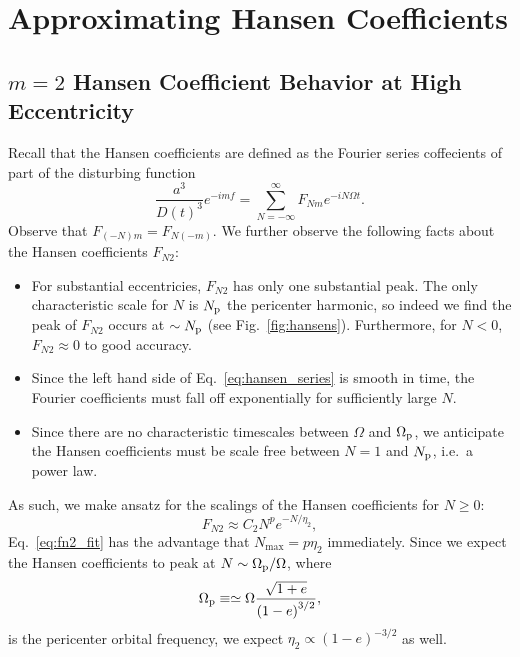 \documentclass[
        fleqn,
        usenatbib,
        referee,
    ]{mnras}
\newcommand*{\p}[1]{\left(#1\right)}
\begin{document}
\section{Approximating Hansen Coefficients}\label{s:hansens}

\subsection{$m=2$ Hansen Coefficient Behavior at High Eccentricity}

Recall that the Hansen coefficients are defined as the Fourier series coffecients
of part of the disturbing function
\begin{equation}
    \frac{a^3}{D(t)^3} e^{-imf} = \sum\limits_{N = -\infty}^\infty
        F_{Nm} e^{-iN\Omega t}.\label{eq:hansen_series}
\end{equation}
Observe that $F_{(-N)m} = F_{N(-m)}$. We further observe the following facts about
the Hansen coefficients $F_{N2}$:
\begin{itemize}
    \item For substantial eccentricies, $F_{N2}$ has only one substantial peak.
        The only characteristic scale for $N$ is $N_{\rm p}$ the pericenter
        harmonic, so indeed we find the peak of $F_{N2}$ occurs at $\sim N_{\rm
        p}$ (see Fig.~\ref{fig:hansens}). Furthermore, for $N < 0$, $F_{N2}
        \approx 0$ to good accuracy.

    \item Since the left hand side of Eq.~\eqref{eq:hansen_series} is smooth in
        time, the Fourier coefficients must fall off exponentially for
        sufficiently large $N$.

    \item Since there are no characteristic timescales between $\Omega$ and
        $\Omega_{\rm p}$, we anticipate the Hansen coefficients must be scale
        free between $N = 1$ and $N_{\rm p}$, i.e.\ a power law.
\end{itemize}
As such, we make ansatz for the scalings of the Hansen coefficients for $N \geq
0$:
\begin{equation}
    F_{N2} \approx C_2 N^{p}e^{-N/\eta_2},\label{eq:fn2_fit}
\end{equation}
Eq.~\eqref{eq:fn2_fit} has the advantage that $N_{\max} = p\eta_2$
immediately. Since we expect the Hansen coefficients to peak at $N \sim
\Omega_{\rm p} / \Omega$, where
\begin{equation}
    \Omega_{\rm p} \equiv \simeq \Omega \frac{\sqrt{1 + e}}{\p{1 - e}^{3/2}},
\end{equation}
is the pericenter orbital frequency, we expect $\eta_2 \propto \p{1 - e}^{-3/2}$
as well.
\end{document}
